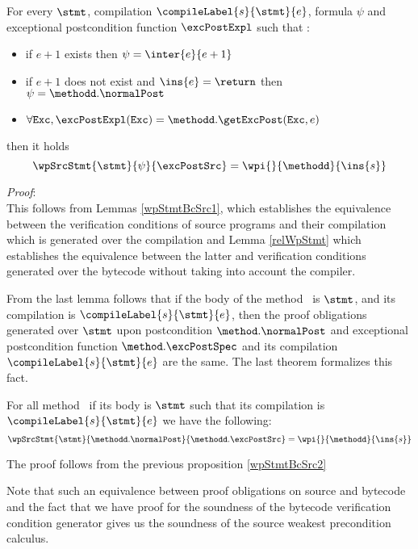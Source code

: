 \begin{wpStmtBcSrc2} \label{wpStmtBcSrc2}
For every $\stmt$, compilation $\compileLabel{s}{\stmt}{e}$,  formula $\psi$ and 
   exceptional postcondition  function $\excPostExpl $ such that :
 
  \begin{itemize}
         \item if $e + 1$ exists then  $\psi = \inter{e}{e+1}$
	 \item if $e+1$ does not exist and $\ins{e} = \return$  then $\psi = \methodd.\normalPost$
	 \item$\forall \mbox{\rm\texttt{Exc}} ,  \excPostExpl( \mbox{\rm\texttt{Exc}} ) = \methodd.\getExcPost(\mbox{\rm\texttt{Exc}}, e) $ 
  \end{itemize}
      then it holds 
$$ \wpSrcStmt{\stmt}{\psi }{\excPostSrc }  = \wpi{}{\methodd}{\ins{s} }$$
\end{wpStmtBcSrc2}
\textit{Proof}: \\
This follows from Lemmas \ref{wpStmtBcSrc1}, which establishes the equivalence between the verification conditions of
 source programs  and their compilation which is generated over the compilation and  Lemma \ref{relWpStmt}  which establishes 
the equivalence between the latter and verification conditions generated over the bytecode without taking into account the compiler.\\
\Qed


From the last lemma follows that if the body of the  method \methodd \ is $\stmt$, and its compilation is $\compileLabel{s}{\stmt}{e}$, then 
the proof obligations generated over $\stmt$ upon postcondition $\method.\normalPost$ and exceptional
postcondition function  $\method.\excPostSpec$     and its compilation $\compileLabel{s}{\stmt}{e}$ are the same. The last theorem 
formalizes this fact.

\begin{theorem}
For all method \methodd \ if its body is $\stmt$ such that its compilation is 
 $\compileLabel{s}{\stmt}{e}$  we have the following:
$$ \wpSrcStmt{\stmt}{\methodd.\normalPost }{\methodd.\excPostSrc }  = \wpi{}{\methodd}{\ins{s} }$$
\end{theorem}
The proof follows from the previous proposition \ref{wpStmtBcSrc2}




Note that such an equivalence between proof obligations on source and bytecode and the fact that
we have proof for the soundness of the bytecode verification condition generator
 gives us the soundness of the source  weakest precondition calculus.  

